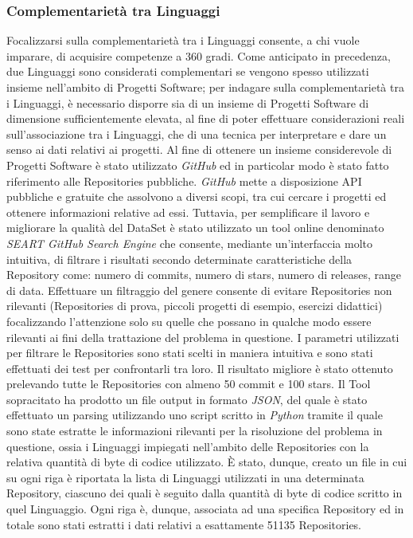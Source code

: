 \subsubsection{Complementarietà tra Linguaggi}
Focalizzarsi sulla complementarietà tra i Linguaggi consente, a chi vuole imparare, di acquisire competenze a 360 gradi.
 Come anticipato in precedenza, due Linguaggi sono considerati complementari se vengono spesso utilizzati insieme nell'ambito di Progetti Software; per indagare sulla complementarietà tra i Linguaggi, è necessario disporre sia di un insieme di Progetti Software di dimensione sufficientemente elevata, al fine di poter effettuare considerazioni reali sull'associazione tra i Linguaggi, che di una tecnica per interpretare e dare un senso ai dati relativi ai progetti. Al fine di ottenere un insieme considerevole di Progetti Software è stato utilizzato \emph{GitHub} ed in particolar modo è stato fatto riferimento alle Repositories pubbliche.
\emph{GitHub} mette a disposizione API pubbliche e gratuite che assolvono a diversi scopi, tra cui cercare i progetti ed ottenere informazioni relative ad essi. Tuttavia, per semplificare il lavoro e migliorare la qualità del DataSet è stato utilizzato un tool online denominato \emph{SEART GitHub Search Engine} \cite{Dabic:msr2021data} che consente, mediante un'interfaccia molto intuitiva, di filtrare i risultati secondo determinate caratteristiche della Repository come: numero di commits, numero di stars, numero di releases, range di data. 
Effettuare un filtraggio del genere consente di evitare Repositories non rilevanti (Repositories di prova, piccoli progetti di esempio, esercizi didattici) focalizzando l'attenzione solo su quelle che possano in qualche modo essere rilevanti ai fini della trattazione del problema in questione. 
I parametri utilizzati per filtrare le Repositories sono stati scelti in maniera intuitiva e sono stati effettuati dei test per confrontarli tra loro. Il risultato migliore è stato ottenuto prelevando tutte le Repositories con almeno 50 commit e 100 stars. Il Tool sopracitato ha prodotto un file output in formato \emph{JSON}, del quale è stato effettuato un parsing utilizzando uno script scritto in \emph{Python} tramite il quale sono state estratte le informazioni rilevanti per la risoluzione del problema in questione, ossia i Linguaggi impiegati nell'ambito delle Repositories con la relativa quantità di byte di codice utilizzato. È stato, dunque, creato un file in cui su ogni riga è riportata la lista di Linguaggi utilizzati in una determinata Repository, ciascuno dei quali è seguito dalla quantità di byte di codice scritto in quel Linguaggio. Ogni riga è, dunque, associata ad una specifica Repository ed in totale sono stati estratti i dati relativi a esattamente 51135 Repositories. \\
